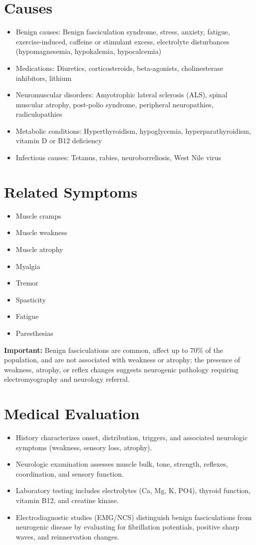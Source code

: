 \section*{Causes}
\begin{itemize}
  \item Benign causes: Benign fasciculation syndrome, stress, anxiety, fatigue, exercise-induced, caffeine or stimulant excess, electrolyte disturbances (hypomagnesemia, hypokalemia, hypocalcemia)
  \item Medications: Diuretics, corticosteroids, beta-agonists, cholinesterase inhibitors, lithium
  \item Neuromuscular disorders: Amyotrophic lateral sclerosis (ALS), spinal muscular atrophy, post-polio syndrome, peripheral neuropathies, radiculopathies
  \item Metabolic conditions: Hyperthyroidism, hypoglycemia, hyperparathyroidism, vitamin D or B12 deficiency
  \item Infectious causes: Tetanus, rabies, neuroborreliosis, West Nile virus
\end{itemize}

\section*{Related Symptoms}
\begin{itemize}
  \item Muscle cramps
  \item Muscle weakness
  \item Muscle atrophy
  \item Myalgia
  \item Tremor
  \item Spasticity
  \item Fatigue
  \item Paresthesias
\end{itemize}
\textbf{Important:} Benign fasciculations are common, affect up to 70\% of the population, and are not associated with weakness or atrophy; the presence of weakness, atrophy, or reflex changes suggests neurogenic pathology requiring electromyography and neurology referral.

\section*{Medical Evaluation}
\begin{itemize}
  \item History characterizes onset, distribution, triggers, and associated neurologic symptoms (weakness, sensory loss, atrophy).
  \item Neurologic examination assesses muscle bulk, tone, strength, reflexes, coordination, and sensory function.
  \item Laboratory testing includes electrolytes (Ca, Mg, K, PO4), thyroid function, vitamin B12, and creatine kinase.
  \item Electrodiagnostic studies (EMG/NCS) distinguish benign fasciculations from neurogenic disease by evaluating for fibrillation potentials, positive sharp waves, and reinnervation changes.
\end{itemize}

